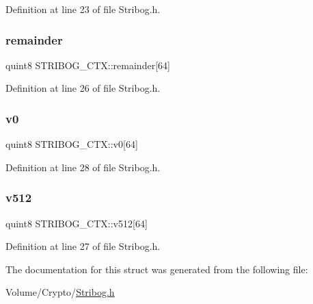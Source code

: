 Definition at line 23 of file Stribog.\+h.

\mbox{\label{struct_s_t_r_i_b_o_g___c_t_x_a7f48565f95a747f5f31c536c8e0d9a6f}} 
\subsubsection{\texorpdfstring{remainder}{remainder}}
{\footnotesize\ttfamily quint8 S\+T\+R\+I\+B\+O\+G\+\_\+\+C\+T\+X\+::remainder\mbox{[}64\mbox{]}}



Definition at line 26 of file Stribog.\+h.

\mbox{\label{struct_s_t_r_i_b_o_g___c_t_x_a8dff93984b776eec14f39bb71eb00243}} 
\subsubsection{\texorpdfstring{v0}{v0}}
{\footnotesize\ttfamily quint8 S\+T\+R\+I\+B\+O\+G\+\_\+\+C\+T\+X\+::v0\mbox{[}64\mbox{]}}



Definition at line 28 of file Stribog.\+h.

\mbox{\label{struct_s_t_r_i_b_o_g___c_t_x_a82aa71d940ffadf7f4f3012295385892}} 
\subsubsection{\texorpdfstring{v512}{v512}}
{\footnotesize\ttfamily quint8 S\+T\+R\+I\+B\+O\+G\+\_\+\+C\+T\+X\+::v512\mbox{[}64\mbox{]}}



Definition at line 27 of file Stribog.\+h.



The documentation for this struct was generated from the following file\+:\begin{DoxyCompactItemize}
\item 
Volume/\+Crypto/\hyperlink{_stribog_8h}{Stribog.\+h}\end{DoxyCompactItemize}
